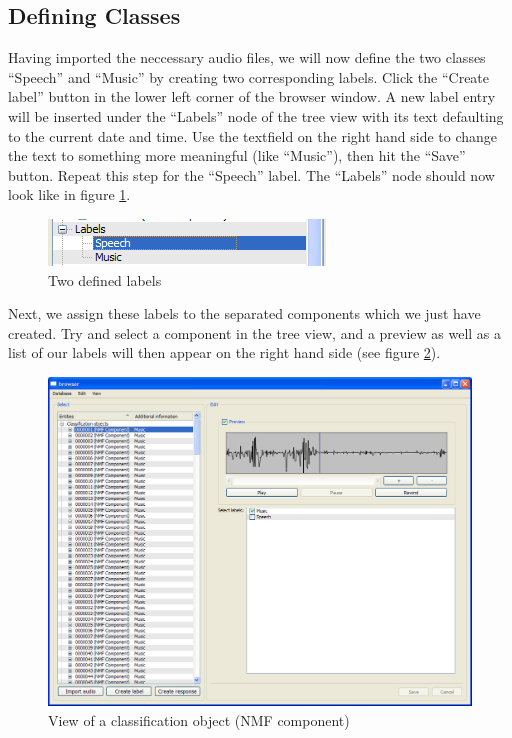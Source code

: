 \subsection{Defining Classes}

Having imported the neccessary audio files, we will now define the two classes
``Speech'' and ``Music'' by creating two corresponding labels. Click the
``Create label'' button in the lower left corner of the browser window. A new
label entry will be inserted under the ``Labels'' node of the tree view with its
text defaulting to the current date and time. Use the textfield on the right
hand side to change the text to something more meaningful (like ``Music''), then
hit the ``Save'' button. Repeat this step for the ``Speech'' label. The
``Labels'' node should now look like in figure \ref{figure:TutorialLabels}.

\begin{figure}
    \centering
    \includegraphics[width=.5\textwidth]{tutorial-media/Labels.png}
    \caption{%
        \label{figure:TutorialLabels}%
        Two defined labels
    }
\end{figure}

Next, we assign these labels to the separated components which we just have
created. Try and select a component in the tree view, and a preview as well as a
list of our labels will then appear on the right hand side (see figure
\ref{figure:TutorialClassificationObjectView}).

\begin{figure}
    \centering
    \includegraphics[width=\textwidth]{tutorial-media/ClassificationObjectView.png}
    \caption{%
        \label{figure:TutorialClassificationObjectView}%
        View of a classification object (NMF component)
    }
\end{figure}

